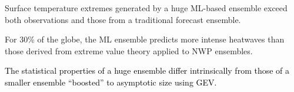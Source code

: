 \documentclass[draft]{agujournal2019}
\newcommand{\newTxt}{\textcolor{black}}
\begin{document}
\begin{keypoints}
\item Surface temperature extremes generated by a huge ML-based ensemble exceed both observations and those from a traditional forecast ensemble. %

\item For 30\% of the globe, the ML ensemble predicts more intense heatwaves than those derived from extreme value theory applied to NWP ensembles. %

\item \newTxt{The statistical properties of a huge ensemble differ intrinsically from those of a smaller ensemble ``boosted'' to asymptotic size using GEV.} %

\end{keypoints}

%
%

%
%
\end{document}
